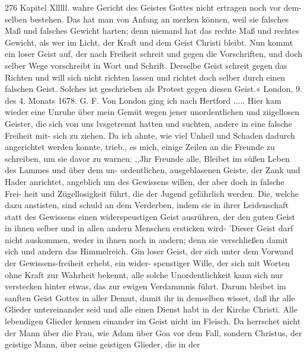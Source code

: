 276 Kapitel Xlllll.
wahre Gericht des Geistes Gottes nicht ertragen noch vor dem-
selben bestehen. Das hat man von Anfang an merken können,
weil sie falsches Maß und falsches Gewicht harten; denn niemand
hat das rechte Maß und rechtes Gewicht, als wer im Licht,
der Kraft und dem Geist Christi bleibt. Nun kommt ein loser
Geist auf, der nach Freiheit schreit und gegen die Vorschriften,
und doch selber Wege vorschreibt in Wort und Schrift. Derselbe
Geist schreit gegen das Richten und will sich nicht richten lassen
und richtet doch selber durch einen falschen Geist. Solches ist
geschrieben als Protest gegen diesen Geist.«
London, 9. des 4. Monats 1678. G. F.
Von London ging ich nach Hertford ..... Hier kam wieder
eine Unruhe über mein Gemüt wegen jener unordentlichen und
ziigellosen Geister, die sich von uns lvsgetrennt hatten und suchten,
andere in eine falsche Freiheit mit- sich zu ziehen. Da ich ahnte,
wie viel Unheil und Schaden dadurch angerichtet werden konnte,
trieb., es mich, einige Zeilen an die Freunde zu schreiben, um sie
davor zu warnen:
,,Jhr Freunde alle,
Bleibet im süßen Leben des Lammes und über dem un-
ordentlichen, ausgeblasenen Geiste, der Zank und Hader anrichtet,
angeblich um des Gewissens willen, der aber doch in falsche Frei-
heit und Zügellosigkeit führt, die der Jugend gefährlich werden.
Die, welche dazu anstisten, sind schuld an dem Verderben, indem
sie in ihrer Leidenschaft statt des Gewissens einen widerspeustigen
Geist ausrühren, der den guten Geist in ihnen selber und in
allen andern Menschen ersticken wird- ’Dieser Geist darf nicht
auskommen, weder in ihnen noch in andern; denn sie verschließen
damit sich und andern das Himmelreich. Gin loser Geist, der
sich unter dem Vorwand der Gewissens-freiheit erhebt, ein wider-
spenstiger Wille, der sich mit Worten ohne Kraft zur Wahrheit
bekennt, alle solche Unordentlichkeit kann sich nur verstecken hinter
etwas, das zur ewigen Verdammnis führt. Darum bleibet
im sanften Geist Gottes in aller Demut, damit ihr in demselben
wisset, daß ihr alle Glieder untereinander seid und alle einen
Dienst habt in der Kirche Christi. Alle lebendigen Glieder kennen
einander im Geist nicht im Fleisch. Da herrschet nicht der Mann
über die Frau, wie Adam über Goa vor dem Fall, sondern Christus,
der geistige Mann, über seine geistigen Glieder, die in der


